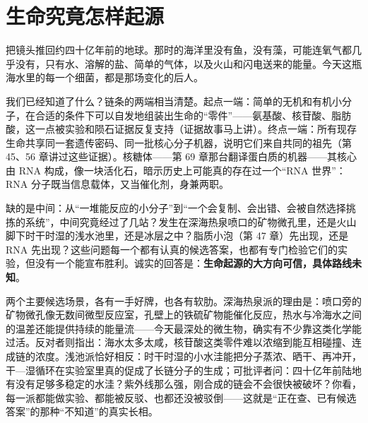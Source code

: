 \section{生命究竟怎样起源}

把镜头推回约四十亿年前的地球。那时的海洋里没有鱼，没有藻，可能连氧气都几乎没有，只有水、溶解的盐、简单的气体，以及火山和闪电送来的能量。今天这瓶海水里的每一个细菌，都是那场变化的后人。

我们已经知道了什么？链条的两端相当清楚。起点一端：简单的无机和有机小分子，在合适的条件下可以自发地组装出生命的“零件”——氨基酸、核苷酸、脂肪酸，这一点被实验和陨石证据反复支持（证据故事马上讲）。终点一端：所有现存生命共享同一套遗传密码、同一批核心分子机器，说明它们来自共同的祖先（第 45、56 章讲过这些证据）。核糖体——第 69 章那台翻译蛋白质的机器——其核心由 RNA 构成，像一块活化石，暗示历史上可能真的存在过一个“RNA 世界”：RNA 分子既当信息载体，又当催化剂，身兼两职。

缺的是中间：从“一堆能反应的小分子”到“一个会复制、会出错、会被自然选择挑拣的系统”，中间究竟经过了几站？发生在深海热泉喷口的矿物微孔里，还是火山脚下时干时湿的浅水池里，还是冰层之中？脂质小泡（第 47 章）先出现，还是 RNA 先出现？这些问题每一个都有认真的候选答案，也都有专门检验它们的实验，但没有一个能宣布胜利。诚实的回答是：\textbf{生命起源的大方向可信，具体路线未知}。

两个主要候选场景，各有一手好牌，也各有软肋。深海热泉派的理由是：喷口旁的矿物微孔像无数间微型反应室，孔壁上的铁硫矿物能催化反应，热水与冷海水之间的温差还能提供持续的能量流——今天最深处的微生物，确实有不少靠这类化学能过活。反对者则指出：海水太多太咸，核苷酸这类零件难以浓缩到能互相碰撞、连成链的浓度。浅池派恰好相反：时干时湿的小水洼能把分子蒸浓、晒干、再冲开，干—湿循环在实验室里真的促成了长链分子的生成；可批评者问：四十亿年前陆地有没有足够多稳定的水洼？紫外线那么强，刚合成的链会不会很快被破坏？你看，每一派都能做实验、都能被反驳、也都还没被驳倒——这就是“正在查、已有候选答案”的那种“不知道”的真实长相。

